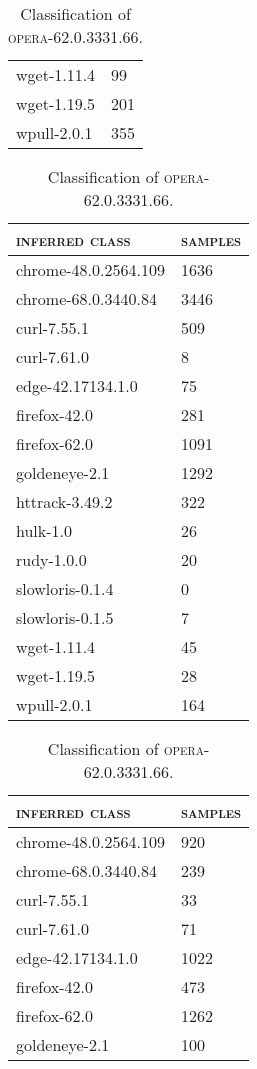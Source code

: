 \begin{table}[H]
\begin{subtable}{.45\linewidth}
\begin{tabular}{ll}
		wget-1.11.4 & 99\\
		wget-1.19.5 & 201\\
		wpull-2.0.1 & 355\\
		\bottomrule
	\end{tabular}
	\caption{Classification of \textsc{grabsite-2.1.16}.}
	\end{subtable}
	\begin{subtable}{.45\linewidth}
		\centering
	\begin{tabular}{ll}
		\toprule
		\textsc{inferred class} & \textsc{samples}\\
		\midrule
		chrome-48.0.2564.109 & 1636\\
		chrome-68.0.3440.84 & 3446\\
		curl-7.55.1 & 509\\
		curl-7.61.0 & 8\\
		edge-42.17134.1.0 & 75\\
		firefox-42.0 & 281\\
		firefox-62.0 & 1091\\
		goldeneye-2.1 & 1292\\
		httrack-3.49.2 & 322\\
		hulk-1.0 & 26\\
		rudy-1.0.0 & 20\\
		slowloris-0.1.4 & 0\\
		slowloris-0.1.5 & 7\\
		wget-1.11.4 & 45\\
		wget-1.19.5 & 28\\
		wpull-2.0.1 & 164\\
		\bottomrule
	\end{tabular}
	\caption{Classification of \textsc{opera-62.0.3331.66}.}
	\end{subtable}
	\begin{subtable}{.45\linewidth}
		\centering
	\begin{tabular}{ll}
		\toprule
		\textsc{inferred class} & \textsc{samples}\\
		\midrule
		chrome-48.0.2564.109 & 920\\
		chrome-68.0.3440.84 & 239\\
		curl-7.55.1 & 33\\
		curl-7.61.0 & 71\\
		edge-42.17134.1.0 & 1022\\
		firefox-42.0 & 473\\
		firefox-62.0 & 1262\\
		goldeneye-2.1 & 100\\

\end{tabular}
\end{subtable}
\end{table}
